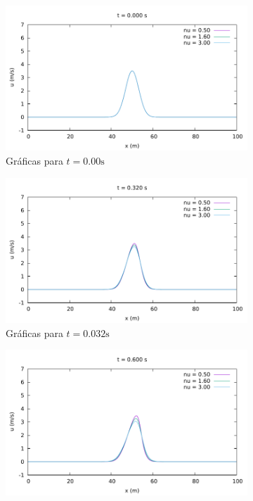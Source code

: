 \documentclass[12pt]{article}
\begin{document}
	\begin{figure}[ht]
		\centering
		\begin{subfigure}{0.4\textwidth}
			\centering
			\includegraphics[width=\textwidth]{../burg-vis1DDF/results/frame000.pdf}
			\caption*{Gráficas para $t=0.00\unit{\second}$}
			\label{fig:vis1ddf1}
		\end{subfigure}\hfill
		\begin{subfigure}{0.4\textwidth}
			\centering
			\includegraphics[width=\textwidth]{../burg-vis1DDF/results/frame016.pdf}
			\caption*{Gráficas para $t=0.032\unit{\second}$}
			\label{fig:vis1ddf2}
		\end{subfigure}\par
		\begin{subfigure}{0.4\textwidth}
			\centering
			\includegraphics[width=\textwidth]{../burg-vis1DDF/results/frame030.pdf}

\end{subfigure}
\end{figure}
\end{document}
